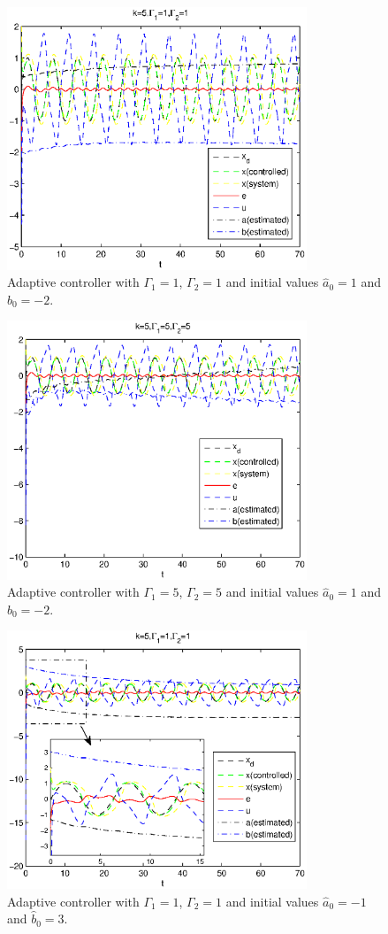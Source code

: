 \documentclass[12pt,a4paper]{article}
\begin{document}
\begin{figure}
  \centering
  \includegraphics[width=0.8\textwidth]{figs/adap_1_init1.eps}%
  \caption{Adaptive controller with $\Gamma_1=1$, $\Gamma_2=1$ and initial values $\hat{a}_0=1$ and $\hat{b}_0=-2$.}
  \label{adap1}
\end{figure}

\begin{figure}
  \centering
  \includegraphics[width=0.8\textwidth]{figs/adap_5_init1.eps}%
  \caption{Adaptive controller with $\Gamma_1=5$, $\Gamma_2=5$ and initial values $\hat{a}_0=1$ and $\hat{b}_0=-2$.}
  \label{adap2}
\end{figure}

\begin{figure}
  \centering
  \includegraphics[width=0.8\textwidth]{figs/adap_1_init2.eps}%
  \caption{Adaptive controller with $\Gamma_1=1$, $\Gamma_2=1$ and initial values $\hat{a}_0=-1$ and $\hat{b}_0=3$.}
  \label{adap3}
\end{figure}
\end{document}
